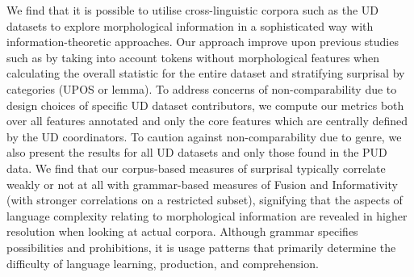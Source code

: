 \documentclass[USenglish]{article}
\begin{document}
We find that it is possible to utilise cross-linguistic corpora such as the UD datasets to explore morphological information in a sophisticated way with information-theoretic approaches. 
Our approach improve upon previous studies such as \citet{ccoltekin2023complexity} by taking into account tokens without morphological features when calculating the overall statistic for the entire dataset and stratifying surprisal by categories (UPOS or lemma). 
To address concerns of non-comparability due to design choices of specific UD dataset contributors, we compute our metrics both over all features annotated and only the core features which are centrally defined by the UD coordinators. 
To caution against non-comparability due to genre, we also present the results for all UD datasets and only those found in the PUD data. 
We find that our corpus-based measures of surprisal typically correlate weakly or not at all with grammar-based measures of Fusion and Informativity (with stronger correlations on a restricted subset), signifying that the aspects of language complexity relating to morphological information are revealed in higher resolution when looking at actual corpora.
Although grammar specifies possibilities and prohibitions, it is usage patterns that primarily determine the difficulty of language learning, production, and comprehension.





\end{document}
